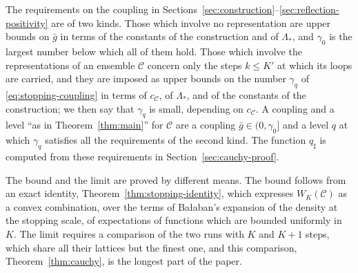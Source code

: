 \documentclass[11pt]{preprint}
\numberwithin{equation}{section}
\theoremstyle{definition}
\theoremstyle{remark}
\theoremstyle{plain}
\begin{document}
The requirements on the coupling in Sections~\ref{sec:construction}--\ref{sec:reflection-positivity} are of two kinds. Those which involve no representation are upper bounds on $\bar g$ in terms of the constants of the construction and of $\Lambda_*$, and $\gamma_0$ is the largest number below which all of them hold. Those which involve the representations of an ensemble $\mathcal C$ concern only the steps $k \leq K'$ at which its loops are carried, and they are imposed as upper bounds on the number $\gamma_q$ of \eqref{eq:stopping-coupling} in terms of $c_{\mathcal C}$, of $\Lambda_*$, and of the constants of the construction; we then say that $\gamma_q$ is small, depending on $c_{\mathcal C}$. A coupling and a level ``as in Theorem~\ref{thm:main}'' for $\mathcal C$ are a coupling $\bar g \in (0, \gamma_0]$ and a level $q$ at which $\gamma_q$ satisfies all the requirements of the second kind. The function $q_\sharp$ is computed from these requirements in Section~\ref{sec:cauchy-proof}.

The bound and the limit are proved by different means. The bound follows from an exact identity, Theorem~\ref{thm:stopping-identity}, which expresses $W_K(\mathcal C)$ as a convex combination, over the terms of Ba{\l}aban's expansion of the density at the stopping scale, of expectations of functions which are bounded uniformly in $K$. The limit requires a comparison of the two runs with $K$ and $K + 1$ steps, which share all their lattices but the finest one, and this comparison, Theorem~\ref{thm:cauchy}, is the longest part of the paper.
\end{document}
